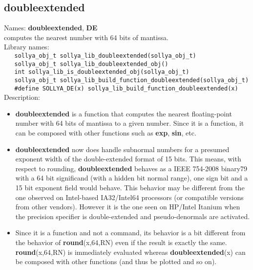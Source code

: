 \subsection{doubleextended}
\label{labdoubleextended}
\noindent Names: \textbf{doubleextended}, \textbf{DE}\\
\phantom{aaa}computes the nearest number with 64 bits of mantissa.\\[0.2cm]
\noindent Library names:\\
\verb|   sollya_obj_t sollya_lib_doubleextended(sollya_obj_t)|\\
\verb|   sollya_obj_t sollya_lib_doubleextended_obj()|\\
\verb|   int sollya_lib_is_doubleextended_obj(sollya_obj_t)|\\
\verb|   sollya_obj_t sollya_lib_build_function_doubleextended(sollya_obj_t)|\\
\verb|   #define SOLLYA_DE(x) sollya_lib_build_function_doubleextended(x)|\\[0.2cm]
\noindent Description: \begin{itemize}

\item \textbf{doubleextended} is a function that computes the nearest floating-point number with
   64 bits of mantissa to a given number. Since it is a function, it can be
   composed with other \sollya functions such as \textbf{exp}, \textbf{sin}, etc.

\item \textbf{doubleextended} now does handle subnormal numbers for a presumed exponent width
   of the double-extended format of 15 bits. This means, with respect to 
   rounding, \textbf{doubleextended} behaves as a IEEE 754-2008 binary79 with a 64 bit 
   significand (with a hidden bit normal range), one sign bit and a 
   15 bit exponent field would behave. This behavior may be different
   from the one observed on Intel-based IA32/Intel64 processors (or compatible
   versions from other vendors). However it is the one seen on HP/Intel 
   Itanium when the precision specifier is double-extended and pseudo-denormals
   are activated.

\item Since it is a function and not a command, its behavior is a bit different from 
   the behavior of \textbf{round}(x,64,RN) even if the result is exactly the same.
   \textbf{round}(x,64,RN) is immediately evaluated whereas \textbf{doubleextended}(x) can be composed 
   with other functions (and thus be plotted and so on).
\end{itemize}

